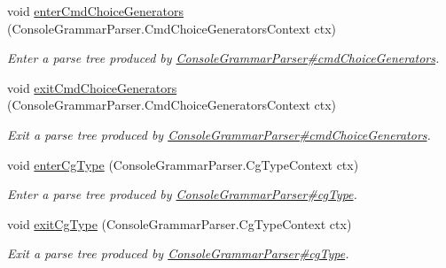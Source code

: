 \begin{DoxyCompactItemize}
void \hyperlink{interfacegov_1_1nasa_1_1jpf_1_1inspector_1_1client_1_1parser_1_1_console_grammar_listener_aacc03282a496bef65a3a2a4ab4e8fc52}{enter\+Cmd\+Choice\+Generators} (Console\+Grammar\+Parser.\+Cmd\+Choice\+Generators\+Context ctx)
\begin{DoxyCompactList}\small\item\em Enter a parse tree produced by \hyperlink{classgov_1_1nasa_1_1jpf_1_1inspector_1_1client_1_1parser_1_1_console_grammar_parser_ae1f2f3e73caeaccbd742f2842d4c986a}{Console\+Grammar\+Parser\#cmd\+Choice\+Generators}. \end{DoxyCompactList}\item 
void \hyperlink{interfacegov_1_1nasa_1_1jpf_1_1inspector_1_1client_1_1parser_1_1_console_grammar_listener_ace24875ad37d83add373ca63da89e543}{exit\+Cmd\+Choice\+Generators} (Console\+Grammar\+Parser.\+Cmd\+Choice\+Generators\+Context ctx)
\begin{DoxyCompactList}\small\item\em Exit a parse tree produced by \hyperlink{classgov_1_1nasa_1_1jpf_1_1inspector_1_1client_1_1parser_1_1_console_grammar_parser_ae1f2f3e73caeaccbd742f2842d4c986a}{Console\+Grammar\+Parser\#cmd\+Choice\+Generators}. \end{DoxyCompactList}\item 
void \hyperlink{interfacegov_1_1nasa_1_1jpf_1_1inspector_1_1client_1_1parser_1_1_console_grammar_listener_afbb4ff7a6135f269c16f791ec7a5282f}{enter\+Cg\+Type} (Console\+Grammar\+Parser.\+Cg\+Type\+Context ctx)
\begin{DoxyCompactList}\small\item\em Enter a parse tree produced by \hyperlink{classgov_1_1nasa_1_1jpf_1_1inspector_1_1client_1_1parser_1_1_console_grammar_parser_ae6e3125de4230c77d8a95cd8064e96d7}{Console\+Grammar\+Parser\#cg\+Type}. \end{DoxyCompactList}\item 
void \hyperlink{interfacegov_1_1nasa_1_1jpf_1_1inspector_1_1client_1_1parser_1_1_console_grammar_listener_a8d6a8ffe1e0fe929876e21175243ce15}{exit\+Cg\+Type} (Console\+Grammar\+Parser.\+Cg\+Type\+Context ctx)
\begin{DoxyCompactList}\small\item\em Exit a parse tree produced by \hyperlink{classgov_1_1nasa_1_1jpf_1_1inspector_1_1client_1_1parser_1_1_console_grammar_parser_ae6e3125de4230c77d8a95cd8064e96d7}{Console\+Grammar\+Parser\#cg\+Type}. \end{DoxyCompactList}\item 

\end{DoxyCompactItemize}
